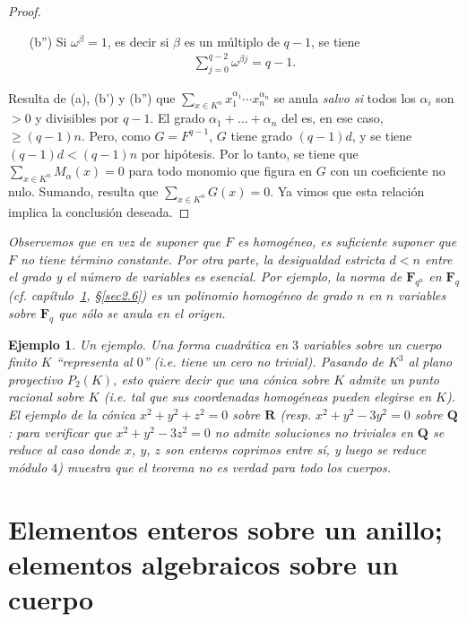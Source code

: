 \documentclass[oneside,bibtotoc,leqno,spanish]{amsbook}
\newcommand{\RR}{\mathbf{R}}
\newcommand{\QQ}{\mathbf{Q}}
\newcommand{\FF}{\mathbf{F}}
\numberwithin{equation}{section}
\newenvironment{comm}%
	{\begin{trivlist}\item\small\itshape}
	{\end{trivlist}}
\theoremstyle{defi}
\theoremstyle{note}
\theoremstyle{rem}
\newtheorem*{example*}{Ejemplo}
\numberwithin{theorem}{section}
\numberwithin{proposition}{section}
\numberwithin{definition}{section}
\numberwithin{lemma}{section}
\numberwithin{corollary}{section}
\numberwithin{example}{section}
\numberwithin{footnote}{section}%
\begin{document}
\begin{proof}
\begin{enumerate}
\item[(b'')] Si $\omega^{\beta} = 1$, es decir si $\beta$ es un m\'ultiplo de $q-1$, se tiene
\begin{gather*}
\sum_{j=0}^{q-2}\omega^{\beta j} = q-1.
\end{gather*}
\end{enumerate}
Resulta de (a), (b') y (b'') que $\sum_{x\in K^{n}}x_{1}^{\alpha_{1}}\cdots x_{n}^{\alpha_{n}}$ se anula {\em salvo
si} todos los $\alpha_{i}$ son $>0$ y divisibles por $q-1$. El grado $\alpha_{1}+\dots+\alpha_{n}$ del
es, en ese caso, $\geq (q-1)n$. Pero, como $G = F^{q-1}$, $G$ tiene grado $(q-1)d$, y se tiene
$(q-1)d < (q-1)n$ por hip\'otesis. Por lo tanto, se tiene que $\sum_{x\in K^{n}}M_{\alpha}(x) = 0$ para todo
monomio que figura en $G$ con un coeficiente no nulo. Sumando, resulta que $\sum_{x\in K^{n}}G(x) = 0$. Ya vimos
que esta relaci\'on implica la conclusi\'on deseada.
\end{proof}

\begin{comm}
Observemos que en vez de suponer que $F$ es homog\'eneo, es suficiente suponer que $F$ no tiene t\'ermino constante.
Por otra parte, la desigualdad {\em estricta} $d < n$ entre el grado y el n\'umero de variables es esencial.
Por ejemplo, la {\em norma} de $\FF_{q^{n}}$ en $\FF_{q}$ (cf. cap\'itulo~\ref{cap2}, \S\ref{sec2.6}) es un polinomio
homog\'eneo de grado $n$ en $n$ variables sobre $\FF_{q}$ que s\'olo se anula en el origen.
\end{comm}

\begin{example*}
{\itshape Un ejemplo.} Una forma cuadr\'atica en $3$ variables sobre un cuerpo {\em finito} $K$
``representa al $0$'' (i.e. tiene un cero no trivial). Pasando de $K^{3}$ al plano proyectivo
$P_{2}(K)$, esto quiere decir que una {\em c\'onica} sobre $K$ admite un punto racional sobre $K$
(i.e. tal que sus coordenadas homog\'eneas pueden elegirse en $K$). El ejemplo de la c\'onica
$x^{2}+y^{2}+z^{2}=0$ sobre $\RR$ (resp. $x^{2}+y^{2}-3y^{2}=0$ sobre $\QQ$: para verificar que
$x^{2}+y^{2}-3z^{2}=0$ no admite soluciones no triviales en $\QQ$ se reduce al caso donde $x$, $y$, $z$
son enteros coprimos entre s\'i, y luego se reduce m\'odulo $4$) muestra que el teorema no es verdad para
todo los cuerpos.
\end{example*}

\chapter%
{Elementos enteros sobre un anillo; elementos algebraicos sobre un cuerpo}
\label{cap2}
\end{document}
